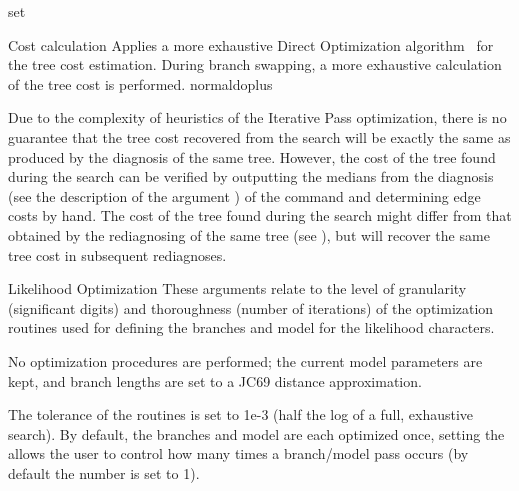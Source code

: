\begin{command}{set}{}
\begin{arguments}
\begin{argumentgroup}{Cost calculation}
                {Applies a more exhaustive Direct Optimization algorithm~\cite{Varon2013} 
                for the tree cost estimation. During branch swapping, a more exhaustive 
                calculation of the tree cost is performed.}
                {normaldoplus}
                
               
	 \begin{statement}
  	        Due to the complexity of heuristics of the Iterative Pass
                optimization, there is no guarantee that the tree cost recovered
                from the search will be exactly the same as produced by the
                diagnosis of the same tree.  However, the cost of the tree found
                during the search can be verified by outputting the medians from
                the diagnosis (see the description of the argument
                ) of the command
                 and determining edge costs by hand. The cost
                of the tree found during the search might differ from that
                obtained by the rediagnosing of the same tree (see
                ), but will recover the same
                tree cost in subsequent rediagnoses. 
            \end{statement}
                           
        \end{argumentgroup}

        \begin{argumentgroup}{Likelihood Optimization}
            {These arguments relate to the level of granularity (significant digits) and 
            thoroughness (number of iterations)  of the
            optimization routines used for defining the branches and model for
            the likelihood characters.}

                {No optimization procedures are performed; the current model
                parameters are kept, and branch lengths are set to a JC69
                distance approximation.}
                {}

                {The tolerance of the routines is set to 1e-3 (half the
                log of a full, exhaustive search). By default, 
                the branches and model are each optimized once, 
                setting the \poyint allows the user to control how 
                many times a branch/model pass occurs
                (by default the number is set to 1).}
                {}


\end{argumentgroup}
\end{arguments}
\end{command}
